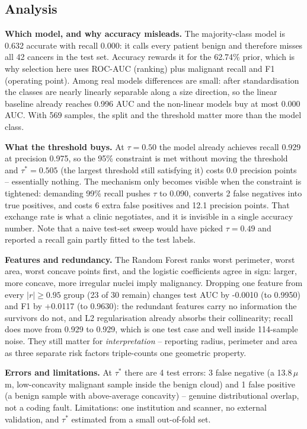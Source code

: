 \documentclass[10pt,conference]{IEEEtran}
\begin{document}
\subsection{Analysis}
\textbf{Which model, and why accuracy misleads.} The majority-class model is
0.632 accurate with recall 0.000: it calls every
patient benign and therefore misses all 42 cancers in the test set. Accuracy rewards
it for the 62.74\% prior, which is why selection here uses ROC-AUC
(ranking) plus malignant recall and F1 (operating point). Among real models differences are
small: after standardisation the classes are nearly linearly separable along a size
direction, so the linear baseline already reaches 0.996 AUC and the
non-linear models buy at most 0.000 AUC.
With 569 samples, the split and the threshold matter more than the model class.

\textbf{What the threshold buys.} At
$\tau=0.50$ the model already achieves recall 0.929 at precision
0.975, so the 95\% constraint is met without moving the threshold and
$\tau^*=0.505$ (the largest threshold still satisfying it) costs
0.0 precision points -- essentially
nothing. The mechanism only becomes visible when the constraint is tightened: demanding
99\% recall pushes $\tau$ to 0.090, converts 2 false negatives
into true positives, and costs 6 extra false positives and
12.1 precision points. That exchange rate is
what a clinic negotiates, and it is invisible in a single accuracy number. Note that a
naive test-set sweep would have picked $\tau=0.49$ and reported a recall gain partly fitted
to the test labels.

\textbf{Features and redundancy.} The Random Forest ranks worst perimeter, worst area, worst concave points first, and the
logistic coefficients agree in sign: larger, more concave, more irregular nuclei imply
malignancy. Dropping one feature from every $|r|\ge0.95$ group (23 of 30 remain) changes test AUC by
-0.0010 (to 0.9950) and F1 by +0.0117
(to 0.9630): the redundant
features carry no information the survivors do not, and L2 regularisation already absorbs
their collinearity; recall does move from 0.929 to
0.929, which is one test case and well inside 114-sample noise.
They still matter for \emph{interpretation} -- reporting radius, perimeter and area as
three separate risk factors triple-counts one geometric property.

\textbf{Errors and limitations.} At $\tau^*$ there are 4 test
errors: 3 false negative (a 13.8\,$\mu$m, low-concavity malignant sample
inside the benign cloud) and 1 false positive (a benign sample with
above-average concavity) -- genuine distributional overlap, not a coding fault.
Limitations: one institution and scanner, no external validation, and $\tau^*$ estimated
from a small out-of-fold set.
\end{document}
